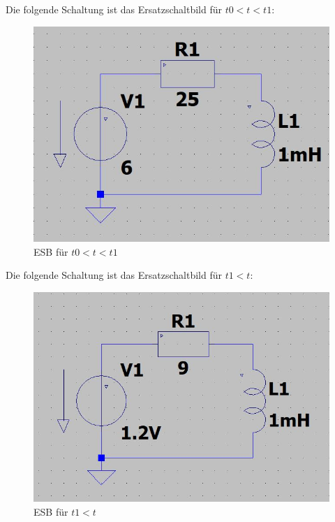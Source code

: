 \documentclass{article}
\begin{document}
Die folgende Schaltung ist das Ersatzschaltbild für $t0 < t < t1$:
\begin{figure}[h]
  \begin{center}
    \includegraphics[scale=0.3]{../assets/images/ET2P5/t0 t t1.JPG}
    \caption{ESB für $t0 < t < t1$ }
  \end{center}
\end{figure}

Die folgende Schaltung ist das Ersatzschaltbild für $t1 < t$:
\begin{figure}[h]
  \begin{center}
    \includegraphics[scale=0.3]{../assets/images/ET2P5/t1 kleiner t.JPG}
    \caption{ESB für $t1 < t$ }
  \end{center}
\end{figure}
\newpage
\end{document}
